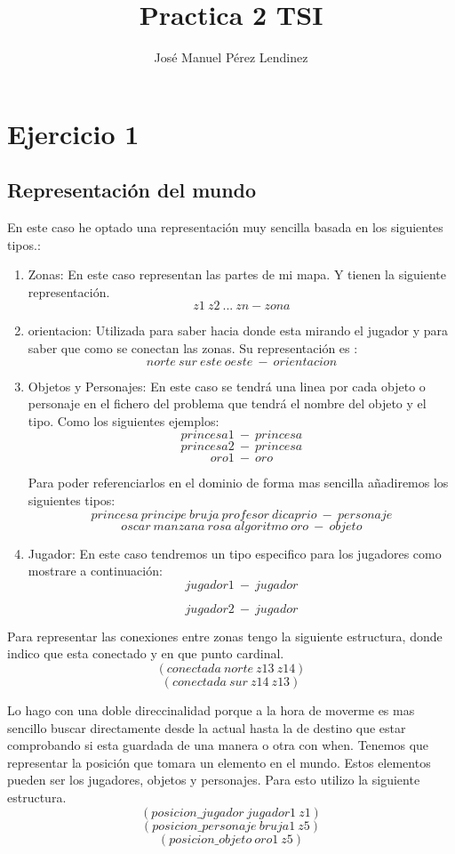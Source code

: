 \documentclass[]{article}
\title{Practica 2 TSI}
\author{José Manuel Pérez Lendinez}
\begin{document}
\maketitle


\newpage
\tableofcontents
\newpage
\section{Ejercicio 1}
\subsection{Representación del mundo}

En este caso he optado una representación muy sencilla basada en los siguientes tipos.:
\begin{enumerate}
\item{Zonas: } En este caso representan las partes de mi mapa. Y tienen la siguiente representación.
$$
z1\ z2\ ...\ zn - zona
$$
\item{orientacion: } Utilizada para saber hacia donde esta mirando el jugador y para saber que como se conectan las zonas. Su representación es :
$$
norte\ sur\ este\ oeste\ -\ orientacion
$$

\item{Objetos y Personajes: } En este caso se tendrá una linea por cada objeto o personaje en el fichero del problema que tendrá el nombre del objeto y el tipo. Como los siguientes ejemplos:
$$
princesa1\ -\ princesa
$$
$$
princesa2\ -\ princesa
$$
$$
oro1\ -\ oro
$$

Para poder referenciarlos en el dominio de forma mas sencilla añadiremos los siguientes tipos:
$$
princesa\ principe\ bruja\ profesor\ dicaprio\ -\ personaje
$$
$$
oscar\ manzana\ rosa\ algoritmo\ oro\ -\ objeto
$$

\item{Jugador: } En este caso tendremos un tipo especifico para los jugadores como mostrare a continuación:
$$
jugador1\ -\ jugador
$$

$$
jugador2\ -\ jugador
$$

\end{enumerate}

Para representar las conexiones entre zonas tengo la siguiente estructura, donde indico que esta conectado y en que punto cardinal.
$$
(conectada\ norte\ z13\ z14)
$$
$$
(conectada\ sur\ z14\ z13)
$$

Lo hago con una doble direccinalidad porque a la hora de moverme es mas sencillo buscar directamente desde la actual hasta la de destino que estar comprobando si esta guardada de una manera o otra con when. 
Tenemos que representar la posición que tomara un elemento en el mundo. Estos elementos pueden ser los jugadores, objetos y personajes. Para esto utilizo la siguiente estructura. 
$$
(posicion\_jugador\ jugador1\ z1)
$$
$$
(posicion\_personaje\ bruja1\ z5)
$$
$$
(posicion\_objeto\ oro1\ z5)
$$
\end{document}
